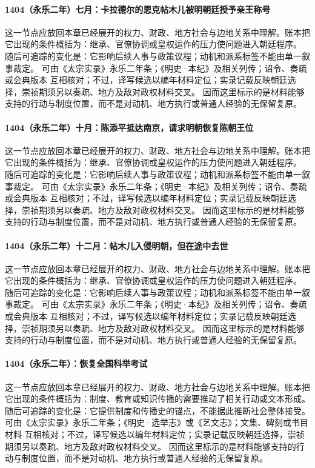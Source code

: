\paragraph{1404（永乐二年）七月：卡拉德尔的恩克帖木儿被明朝廷授予亲王称号} 这一节点应放回本章已经展开的权力、财政、地方社会与边地关系中理解。账本把它出现的条件概括为：继承、官僚协调或皇权运作的压力使问题进入朝廷程序。 随后可追踪的变化是：它影响后续人事与政策议程；动机和派系标签不能由单一叙事裁定。 可由《太宗实录》永乐二年条；《明史·本纪》及相关列传；诏令、奏疏或会典版本 互相核对；不过，译写候选以编年材料定位；实录记载反映朝廷选择，崇祯期须另以奏疏、地方及敌对政权材料交叉。 因而这里标示的是材料能够支持的行动与制度位置，而不是对动机、地方执行或普通人经验的无保留复原。

\paragraph{1404（永乐二年）十月：陈添平抵达南京，请求明朝恢复陈朝王位} 这一节点应放回本章已经展开的权力、财政、地方社会与边地关系中理解。账本把它出现的条件概括为：继承、官僚协调或皇权运作的压力使问题进入朝廷程序。 随后可追踪的变化是：它影响后续人事与政策议程；动机和派系标签不能由单一叙事裁定。 可由《太宗实录》永乐二年条；《明史·本纪》及相关列传；诏令、奏疏或会典版本 互相核对；不过，译写候选以编年材料定位；实录记载反映朝廷选择，崇祯期须另以奏疏、地方及敌对政权材料交叉。 因而这里标示的是材料能够支持的行动与制度位置，而不是对动机、地方执行或普通人经验的无保留复原。

\paragraph{1404（永乐二年）十二月：帖木儿入侵明朝，但在途中去世} 这一节点应放回本章已经展开的权力、财政、地方社会与边地关系中理解。账本把它出现的条件概括为：继承、官僚协调或皇权运作的压力使问题进入朝廷程序。 随后可追踪的变化是：它影响后续人事与政策议程；动机和派系标签不能由单一叙事裁定。 可由《太宗实录》永乐二年条；《明史·本纪》及相关列传；诏令、奏疏或会典版本 互相核对；不过，译写候选以编年材料定位；实录记载反映朝廷选择，崇祯期须另以奏疏、地方及敌对政权材料交叉。 因而这里标示的是材料能够支持的行动与制度位置，而不是对动机、地方执行或普通人经验的无保留复原。

\paragraph{1404（永乐二年）：恢复全国科举考试} 这一节点应放回本章已经展开的权力、财政、地方社会与边地关系中理解。账本把它出现的条件概括为：制度、教育或知识传播的需要推动了相关行动或文本形成。 随后可追踪的变化是：它提供制度和传播史的锚点，不能据此推断社会整体接受。 可由《太宗实录》永乐二年条；《明史·选举志》或《艺文志》；文集、碑刻或书目材料 互相核对；不过，译写候选以编年材料定位；实录记载反映朝廷选择，崇祯期须另以奏疏、地方及敌对政权材料交叉。 因而这里标示的是材料能够支持的行动与制度位置，而不是对动机、地方执行或普通人经验的无保留复原。

